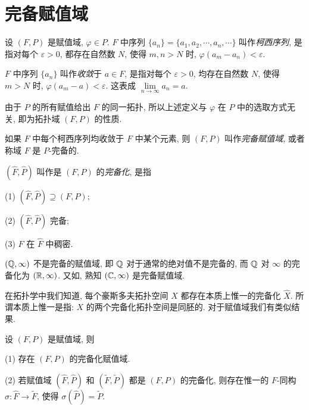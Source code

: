 \section{完备赋值域}\label{sec:ch8-s1}

\begin{definition}\label{def:ch8-1}
设 $(F,P)$ 是赋值域, $\varphi\in P$. $F$ 中序列 $\{a_n\}=\{a_1,a_2,\cdots,a_n,\cdots\}$ 叫作\emph{柯西序列}, 是指对每个 $\varepsilon>0$, 都存在自然数 $N$, 使得 $m,n>N$ 时, $\varphi(a_m-a_n)<\varepsilon$.

$F$ 中序列 $\{a_n\}$ 叫作\emph{收敛}于 $a\in F$, 是指对每个 $\varepsilon>0$, 均存在自然数 $N$, 使得 $m>N$ 时, $\varphi(a_m-a)<\varepsilon$. 这表成 $\lim\limits_{n\to\infty}a_n=a$.

由于 $P$ 的所有赋值给出 $F$ 的同一拓扑, 所以上述定义与 $\varphi$ 在 $P$ 中的选取方式无关, 即为拓扑域 $(F,P)$ 的性质.

如果 $F$ 中每个柯西序列均收敛于 $F$ 中某个元素, 则 $(F,P)$ 叫作\emph{完备赋值域}, 或者称域 $F$ 是 $P$-完备的.

$(\widehat{F},\widehat{P})$ 叫作是 $(F,P)$ 的\emph{完备化}, 是指

(1) $(\widehat{F},\widehat{P})\supseteq(F,P)$;

(2) $(\widehat{F},\widehat{P})$ 完备;

(3) $F$ 在 $\widehat{F}$ 中稠密.
\end{definition}

\begin{example}
$(\mathbb{Q},\infty)$ 不是完备的赋值域, 即 $\mathbb{Q}$ 对于通常的绝对值不是完备的, 而 $\mathbb{Q}$ 对 $\infty$ 的完备化为 $(\mathbb{R},\infty)$. 又如, 熟知 $(\mathbb{C},\infty)$ 是完备赋值域.
\end{example}

在拓扑学中我们知道, 每个豪斯多夫拓扑空间 $X$ 都存在本质上惟一的完备化 $\widehat{X}$. 所谓本质上惟一是指: $X$ 的两个完备化拓扑空间是同胚的. 对于赋值域我们有类似结果.

\begin{theorem}\label{thm:8.1}
设 $(F,P)$ 是赋值域, 则

(1) 存在 $(F,P)$ 的完备化赋值域.

(2) 若赋值域 $(\widehat{F},\widehat{P})$ 和 $(\widetilde{F},\widetilde{P})$ 都是 $(F,P)$ 的完备化, 则存在惟一的 $F$-同构 $\sigma\colon\widehat{F}\to\widetilde{F}$, 使得 $\sigma(\widehat{P})=\widetilde{P}$.
\end{theorem}

